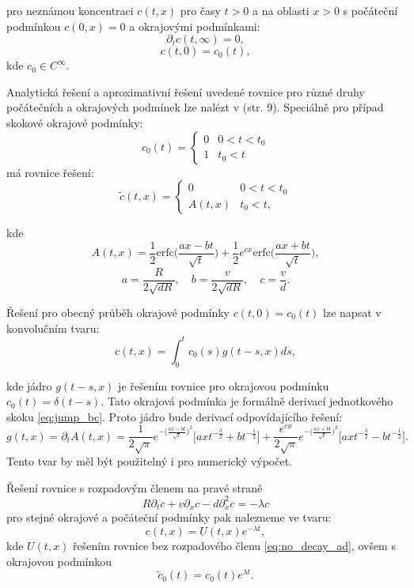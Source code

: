 \documentclass{article}
\def\prtl{\partial}
\begin{document}
pro neznámou koncentraci $c(t, x)$ pro časy $t>0$ a na oblasti $x>0$ s počáteční podmínkou $c(0, x) = 0$ a
okrajovými podmínkami:
\[
    \prtl_t c(t, \infty) = 0,
\]
\[
    c(t, 0) = c_0(t),
\]
kde $c_0 \in C^\infty$.

Analytická řešení a aproximativní řešení uvedené rovnice pro různé druhy počátečních
a okrajových podmínek lze nalézt v \cite{Genuchten1982} (str. 9). 
Speciálně pro případ skokové okrajové podmínky:
\begin{equation}
    \label{eq:jump_bc}
    c_0(t) = \left\{\begin{array}{ll}
         0 & 0 < t < t_0 \\
         1   & t_0 < t
    \end{array}\right. 
\end{equation}
má rovnice řešení:
\begin{equation}
    \label{eq:jump_sol}
    \tilde c(t, x) = 
    \left\{\begin{array}{ll}
         0                     & 0 < t < t_0 \\
         A(t,x)   & t_0 < t,
    \end{array}\right. 
\end{equation}

kde
\[
    A(t,x) = \frac12 \mathrm{erfc}\Big(\frac{ax-bt}{\sqrt t}\Big)
    + \frac12 e^{cx}\mathrm{erfc}\Big(\frac{ax+bt}{\sqrt t}\Big),
\]
\[
    a = \frac{R}{2\sqrt{dR}},\quad 
    b=\frac{v}{2\sqrt{dR}},\quad 
    c=\frac{v}{d}.
\]

Řešení pro obecný průběh okrajové podmínky $c(t,0) = c_0(t)$ lze napsat v konvolučním tvaru:
\[
    c(t,x) = \int_0^t c_0(s) g(t - s, x) ds,
\]

kde jádro $g(t - s, x)$ je řešením rovnice pro okrajovou podmínku $c_0(t) = \delta(t - s)$. 
Tato okrajová podmínka je formálně derivací jednotkového skoku \eqref{eq:jump_bc}. 
Proto jádro bude derivací odpovídajícího řešení:
\[
    g(t, x) = \prtl_t A(t, x) = 
    \frac{1}{2\sqrt{\pi}} 
    e^{-\big( \frac{ax-bt}{\sqrt{t}}\big)^2}
    \Big[ ax t^{-\frac32} + b t^{-\frac12}\Big]
    + \frac{e^{cx}}{2\sqrt{\pi}}  
    e^{-\big( \frac{ax+bt}{\sqrt{t}}\big)^2}
    \Big[ ax t^{-\frac32} - b t^{-\frac12}\Big].
\]
Tento tvar by měl být použitelný i pro numerický výpočet.


Řešení rovnice s rozpadovým členem na pravé straně
\[
 R\prtl_t c + v \prtl_x c - d \prtl^2_x c = - \lambda c
\]
pro stejné okrajové a počáteční podmínky pak nalezneme ve tvaru:
\[
    c(t,x) = U(t,x) e^{-\lambda t},
\]
kde $U(t,x)$ řešením rovnice bez rozpadového členu \eqref{eq:no_decay_ad}, ovšem s okrajovou podmínkou
\[
    \tilde{c}_0(t) = c_0(t) e^{\lambda t}.
\]
\end{document}
